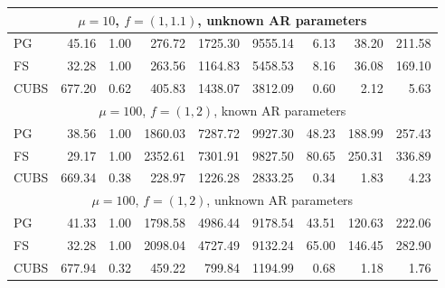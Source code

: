 \documentclass[12pt]{article}
\begin{document}
\begin{table}
\begin{tabular}{l r r r r r r r r }
 \\ %

\hline
 \multicolumn{9}{c}{$\mu=10$, $f = (1,1.1)$, unknown AR parameters} \\
\hline
             PG   &    45.16 &     1.00 &    276.72 &   1725.30 &   9555.14 &      6.13 &     38.20 &    211.58 \\ 
             FS   &    32.28 &     1.00 &    263.56 &   1164.83 &   5458.53 &      8.16 &     36.08 &    169.10 \\ 
           CUBS   &   677.20 &     0.62 &    405.83 &   1438.07 &   3812.09 &      0.60 &      2.12 &      5.63
 \\ %

\hline
 \multicolumn{9}{c}{$\mu=100$, $f = (1,2)$, known AR parameters} \\
\hline
            PG  &    38.56 &     1.00 &   1860.03 &   7287.72 &   9927.30 &     48.23 &    188.99 &    257.43 \\ 
            FS  &    29.17 &     1.00 &   2352.61 &   7301.91 &   9827.50 &     80.65 &    250.31 &    336.89 \\ 
          CUBS  &   669.34 &     0.38 &    228.97 &   1226.28 &   2833.25 &      0.34 &      1.83 &      4.23

 \\ %

\hline
 \multicolumn{9}{c}{$\mu=100$, $f = (1,2)$, unknown AR parameters} \\
\hline
             PG   &    41.33 &     1.00 &   1798.58 &   4986.44 &   9178.54 &     43.51 &    120.63 &    222.06 \\ 
             FS   &    32.28 &     1.00 &   2098.04 &   4727.49 &   9132.24 &     65.00 &    146.45 &    282.90 \\ 
           CUBS   &   677.94 &     0.32 &    459.22 &    799.84 &   1194.99 &      0.68 &      1.18 &      1.76
 \\ %


\end{tabular}
\end{table}
\end{document}
